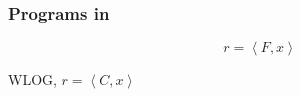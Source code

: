 \begin{frame}

\frametitle{Programs in \D{}}

\begin{center}

$$r=\left\langle F, x \right\rangle$$

WLOG, $r=\left\langle C,x \right\rangle$

\end{center}

\end{frame}
